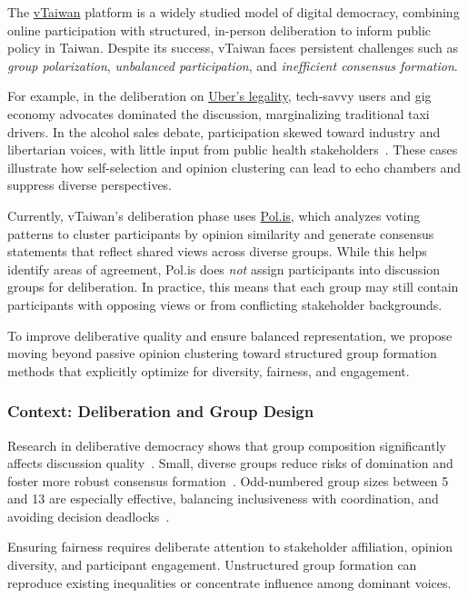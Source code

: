 The \href{https://vtaiwan.tw}{vTaiwan} platform is a widely studied model of digital democracy,
combining online participation with structured, in-person deliberation to inform public policy in Taiwan.
Despite its success, vTaiwan faces persistent challenges such as \textit{group polarization},
\textit{unbalanced participation}, and \textit{inefficient consensus formation}.

For example, in the deliberation on
\href{https://blog.pol.is/uber-responds-to-vtaiwans-coherent-blended-volition-3e9b75102b9b}{Uber's legality},
tech-savvy users and gig economy advocates dominated the discussion,
marginalizing traditional taxi drivers.
In the alcohol sales debate, participation skewed toward industry and libertarian voices,
with little input from public health stakeholders~\parencite{tiku2018taiwan}.
These cases illustrate how self-selection and opinion clustering can lead to echo chambers
and suppress diverse perspectives.

Currently, vTaiwan's deliberation phase uses \href{https://pol.is/home}{Pol.is},
which analyzes voting patterns to cluster participants by opinion similarity
and generate consensus statements that reflect shared views across diverse groups.
While this helps identify areas of agreement,
Pol.is does \textit{not} assign participants into discussion groups for deliberation.
In practice, this means that each group may still contain participants with opposing views
or from conflicting stakeholder backgrounds.

To improve deliberative quality and ensure balanced representation,
we propose moving beyond passive opinion clustering
toward structured group formation methods that explicitly optimize for diversity, fairness, and engagement.

\subsubsection*{Context: Deliberation and Group Design}

Research in deliberative democracy shows that group composition
significantly affects discussion quality~\parencite{fay2000group}.
Small, diverse groups reduce risks of domination
and foster more robust consensus formation~\parencite{anagnostopoulos2012groupformation}.
Odd-numbered group sizes between 5 and 13 are especially effective,
balancing inclusiveness with coordination,
and avoiding decision deadlocks~\parencite{fishkin2009deliberative, menon2011oddgroups}.

Ensuring fairness requires deliberate attention to stakeholder affiliation, opinion diversity,
and participant engagement.
Unstructured group formation can reproduce existing inequalities
or concentrate influence among dominant voices.

